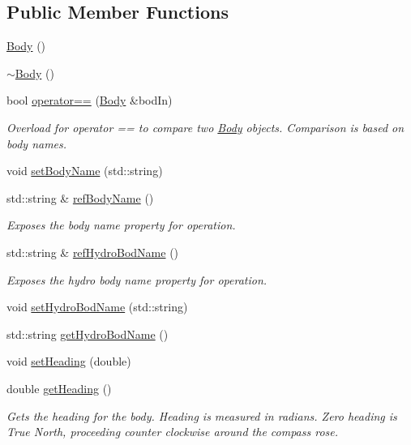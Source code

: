 \subsection*{Public Member Functions}
\begin{DoxyCompactItemize}
\item 
\hyperlink{classosea_1_1ofreq_1_1_body_a7727b0d8c998bbc2942e4c802e31e2eb}{Body} ()
\item 
\hyperlink{classosea_1_1ofreq_1_1_body_abe1c4da65568cf7978b6247affc461e3}{$\sim$\-Body} ()
\item 
bool \hyperlink{classosea_1_1ofreq_1_1_body_ad4580795d6db4b4ffd23db2a21ace9c7}{operator==} (\hyperlink{classosea_1_1ofreq_1_1_body}{Body} \&bod\-In)
\begin{DoxyCompactList}\small\item\em Overload for operator == to compare two \hyperlink{classosea_1_1ofreq_1_1_body}{Body} objects. Comparison is based on body names. \end{DoxyCompactList}\item 
void \hyperlink{classosea_1_1ofreq_1_1_body_a617bde11c3c42cc2ecbf3d5a7319a904}{set\-Body\-Name} (std\-::string)
\item 
std\-::string \& \hyperlink{classosea_1_1ofreq_1_1_body_ae1f5ffd42ba3b276a056eb56ec6ed5a9}{ref\-Body\-Name} ()
\begin{DoxyCompactList}\small\item\em Exposes the body name property for operation. \end{DoxyCompactList}\item 
std\-::string \& \hyperlink{classosea_1_1ofreq_1_1_body_aef09a9c9b037e1b4e42fbdd1fa61c65d}{ref\-Hydro\-Bod\-Name} ()
\begin{DoxyCompactList}\small\item\em Exposes the hydro body name property for operation. \end{DoxyCompactList}\item 
void \hyperlink{classosea_1_1ofreq_1_1_body_a9fadda19cdff7c41800b5fe3b994b49e}{set\-Hydro\-Bod\-Name} (std\-::string)
\item 
std\-::string \hyperlink{classosea_1_1ofreq_1_1_body_ada5245142768e7b4cdc74504651438bb}{get\-Hydro\-Bod\-Name} ()
\item 
void \hyperlink{classosea_1_1ofreq_1_1_body_a7bba55a8fd4aea7a17ce7bd5f54d6ab8}{set\-Heading} (double)
\item 
double \hyperlink{classosea_1_1ofreq_1_1_body_ac34e65deb4894bd5c2b5d4089be0dcb0}{get\-Heading} ()
\begin{DoxyCompactList}\small\item\em Gets the heading for the body. Heading is measured in radians. Zero heading is True North, proceeding counter clockwise around the compass rose. \end{DoxyCompactList}\item 

\end{DoxyCompactItemize}
